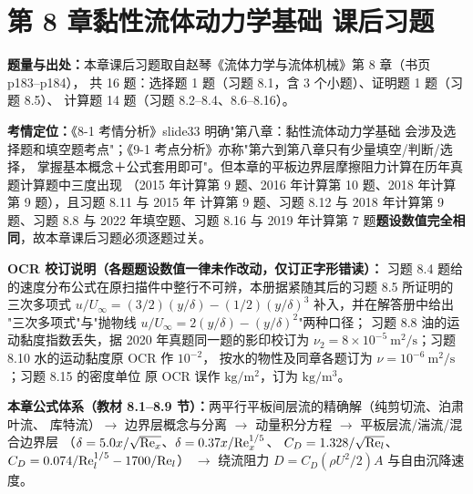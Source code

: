 \chapter*{第 8 章\quad 黏性流体动力学基础 课后习题}

\begin{tishi}
\textbf{题量与出处：}本章课后习题取自赵琴《流体力学与流体机械》第 8 章（书页 p183--p184），
共 16 题：选择题 1 题（习题 8.1，含 3 个小题）、证明题 1 题（习题 8.5）、
计算题 14 题（习题 8.2--8.4、8.6--8.16）。

\textbf{考情定位：}《8-1 考情分析》slide33 明确"第八章：黏性流体动力学基础
会涉及选择题和填空题考点"；《9-1 考点分析》亦称"第六到第八章只有少量填空/判断/选择，
掌握基本概念＋公式套用即可"。但本章的平板边界层摩擦阻力计算在历年真题计算题中三度出现
（2015 年计算第 9 题、2016 年计算第 10 题、2018 年计算第 9 题），且习题 8.11 与 2015 年
计算第 9 题、习题 8.12 与 2018 年计算第 9 题、习题 8.8 与 2022 年填空题、习题 8.16 与
2019 年计算第 7 题\textbf{题设数值完全相同}，故本章课后习题必须逐题过关。

\textbf{OCR 校订说明（各题题设数值一律未作改动，仅订正字形错读）：}
习题 8.4 题给的速度分布公式在原扫描件中整行不可辨，本册据紧随其后的习题 8.5 所证明的
三次多项式 $u/U_\infty=(3/2)(y/\delta)-(1/2)(y/\delta)^3$ 补入，并在解答册中给出
"三次多项式"与"抛物线 $u/U_\infty=2(y/\delta)-(y/\delta)^2$"两种口径；
习题 8.8 油的运动黏度指数丢失，据 2020 年真题同一题的影印校订为
$\nu_2=8\times10^{-5}\ \mathrm{m^2/s}$；习题 8.10 水的运动黏度原 OCR 作 $10^{-2}$，
按水的物性及同章各题订为 $\nu=10^{-6}\ \mathrm{m^2/s}$；习题 8.15 的密度单位
原 OCR 误作 $\mathrm{kg/m^2}$，订为 $\mathrm{kg/m^3}$。

\textbf{本章公式体系（教材 8.1--8.9 节）：}两平行平板间层流的精确解（纯剪切流、泊肃叶流、
库特流）$\to$ 边界层概念与分离 $\to$ 动量积分方程 $\to$ 平板层流/湍流/混合边界层
（$\delta=5.0x/\sqrt{\mathrm{Re}_x}$、$\delta=0.37x/\mathrm{Re}_x^{1/5}$、
$C_D=1.328/\sqrt{\mathrm{Re}_l}$、$C_D=0.074/\mathrm{Re}_l^{1/5}-1700/\mathrm{Re}_l$）
$\to$ 绕流阻力 $D=C_D(\rho U^2/2)A$ 与自由沉降速度。
\end{tishi}


